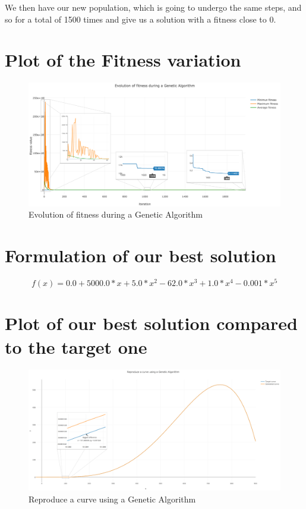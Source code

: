 \documentclass[12pt]{article}
\begin{document}
We then have our new population, which is going to undergo the same steps, and so for a total of 1500 times and give us a solution with a fitness close to 0.

\section{Plot of the Fitness variation}

\begin{figure}[H]
	\centering
	\includegraphics[width=0.8\columnwidth]{./plot_fitness_evolution.png}
	\caption{Evolution of fitness during a Genetic Algorithm}
\end{figure}

\section{Formulation of our best solution}

$$f(x) = 0.0 + 5000.0*x + 5.0*x^2 - 62.0*x^3 + 1.0*x^4 - 0.001*x^5$$

\section{Plot of our best solution compared to the target one}

\begin{figure}[H]
	\centering
	\includegraphics[width=0.8\columnwidth]{./plot_solution.png}
	\caption{Reproduce a curve using a Genetic Algorithm}
\end{figure}
\end{document}
